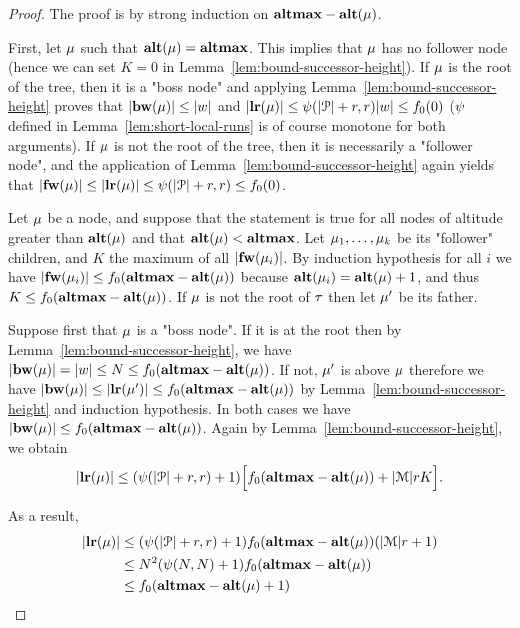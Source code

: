\begin{proof}
	The proof is by strong induction on $\mathbf{altmax}-\mathbf{alt}(\mu)$.

	First, let $\mu$ such that $\mathbf{alt}(\mu) = \mathbf{altmax}$. This implies that $\mu$ has no follower node (hence we can set $K=0$ in Lemma~\ref{lem:bound-successor-height}).  If $\mu$ is the root of the tree, then it is a "boss node" and applying Lemma~\ref{lem:bound-successor-height} proves that $|\mathbf{bw}(\mu)| \leq |w|$ and $|\mathbf{lr}(\mu)| \leq \psi(|\mathcal{P}|+r,r) |w| \leq f_0(0)$ ($\psi$ defined in Lemma~\ref{lem:short-local-runs} is of course monotone for both arguments). If $\mu$ is not the root of the tree, then it is necessarily a "follower node", and the application of Lemma~\ref{lem:bound-successor-height} again yields that $|\mathbf{fw}(\mu)| \leq |\mathbf{lr}(\mu)| \leq \psi(|\mathcal{P}|+r,r) \leq f_0(0)$.   

	Let $\mu$ be a node, and suppose that the statement is true for all nodes of altitude greater than $\mathbf{alt}(\mu)$ and that $\mathbf{alt}(\mu) < \mathbf{altmax}$. 
	Let $\mu_1, \ldots, \mu_k$ be its "follower" children, and $K$ the maximum of all $|\mathbf{fw}(\mu_i)|$.  By induction hypothesis for all $i$ we have 
	$|\mathbf{fw}(\mu_i)| \leq f_0(\mathbf{altmax}-\mathbf{alt}(\mu))$ because $\mathbf{alt}(\mu_i) = \mathbf{alt}(\mu)+1$, and thus $K \leq f_0(\mathbf{altmax}-\mathbf{alt}(\mu))$. If $\mu$ is not the root of $\tau$ then let $\mu'$ be its father.
	
	Suppose first that $\mu$ is a "boss node". If it is at the root then by Lemma~\ref{lem:bound-successor-height}, we have $|\mathbf{bw}(\mu)| = |w| \leq N \leq f_0(\mathbf{altmax} - \mathbf{alt}(\mu))$. If not, $\mu'$ is above $\mu$ therefore we have $|\mathbf{bw}(\mu)| \leq |\mathbf{lr}(\mu')| \leq f_0(\mathbf{altmax} - \mathbf{alt}(\mu))$ by Lemma~\ref{lem:bound-successor-height} and induction hypothesis. In both cases we have $|\mathbf{bw}(\mu)| \leq f_0(\mathbf{altmax} - \mathbf{alt}(\mu))$.	
	Again by Lemma~\ref{lem:bound-successor-height}, we obtain \[|\mathbf{lr}(\mu)| \leq (\psi(|\mathcal{P}|+r,r)+1) \Big[f_0(\mathbf{altmax}-\mathbf{alt}(\mu)) + |\mathcal{M}|rK\Big]. \]
	
	 As a result, 
	\begin{align*}
	|\mathbf{lr}(\mu)|& 
	\leq (\psi(|\mathcal{P}|+r,r)+1) f_0(\mathbf{altmax}-\mathbf{alt}(\mu))(|\mathcal{M}| r +1) \\&  
	\leq N^2(\psi(N,N) +1) f_0(\mathbf{altmax} - \mathbf{alt}(\mu)) \\& 
	\leq f_0(\mathbf{altmax} - \mathbf{alt}(\mu)+1)
	\end{align*}
	

\end{proof}
